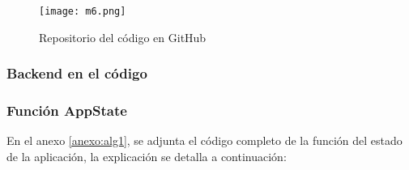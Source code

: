 \begin{figure}[ht]
\centering
  \texttt{[image: m6.png]}
  \caption{Repositorio del código en GitHub}
  \label{m6}
\end{figure}






\subsubsection{Backend en el código}

\subsubsection*{Función AppState}

En el anexo \ref{anexo:alg1}, se adjunta el código completo de la función del estado de la aplicación, la explicación se detalla a continuación:
